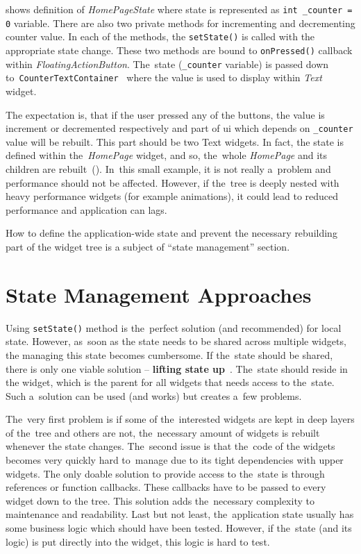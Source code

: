  shows definition of \textit{HomePageState} where state is represented as \verb|int _counter = 0| variable. There are also two private methods for incrementing and decrementing counter value. In each of the methods, the \verb|setState()| is called with the appropriate state change.  These two methods are bound to \verb|onPressed()| callback within \textit{FloatingActionButton}. The~state (\verb|_counter| variable) is passed down to~\verb|CounterTextContainer|~ where the value is used to display within \textit{Text} widget. 

The expectation is, that if the user pressed any of the buttons, the value is increment or decremented respectively and part of \gls{ui} which depends on \verb|_counter| value will be rebuilt. This part should be two Text widgets. In fact, the state is defined within the~\textit{HomePage} widget, and so, the~whole \textit{HomePage} and its children are rebuilt~(). In~this small example, it is not really a~problem and performance should not be affected. However, if the~tree is deeply nested with heavy performance widgets (for example animations), it could lead to reduced performance and application can lags. 

How to define the application-wide state and prevent the necessary rebuilding part of the widget tree is a subject of ``state management'' section.
\section{State Management Approaches}
Using \verb|setState()| method is the~perfect solution (and recommended) for local state. However, as~soon as the state needs to be shared across multiple widgets, the managing this state becomes cumbersome. If the~state should be shared, there is only one viable solution -- \textbf{lifting state up}~\cite{flutter-simple-state-management}. The~state should reside in the widget, which is the parent for all widgets that needs access to the~state. Such a~solution can be used (and works) but creates a~few problems. 

The~very first problem is if some of the~interested widgets are kept in deep layers of the~tree and others are not, the~necessary amount of widgets is rebuilt whenever the state changes. The~second issue is that the~code of the widgets becomes very quickly hard to~manage due to its tight dependencies with upper widgets. The only doable solution to provide access to the~state is through references or function callbacks. These callbacks have to be passed to every widget down to the tree. This solution adds the~necessary complexity to maintenance and readability. Last but not least, the~application state usually has some business logic which should have been tested. However, if the~state (and its logic) is put directly into the widget, this logic is hard to test. 

